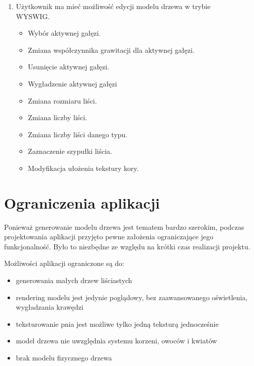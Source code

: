 \begin{enumerate}
\item Użytkownik ma mieć możliwość edycji modelu drzewa w trybie \\WYSWIG.
\begin{itemize}
\item Wybór aktywnej gałęzi.
\item Zmiana współczynnika grawitacji dla aktywnej gałęzi.
\item Usunięcie aktywnej gałęzi.
\item Wygładzenie aktywnej gałęzi
\item Zmiana rozmiaru liści.
\item Zmiana liczby liści.
\item Zmiana liczby liści danego typu.
\item Zaznaczenie szypułki liścia.
\item Modyfikacja ułożenia tekstury kory.
\end{itemize}
\end{enumerate}

\section{Ograniczenia aplikacji}
Ponieważ generowanie modelu drzewa jest tematem bardzo szerokim, podczas projektowania
aplikacji przyjęto pewne założenia ograniczające jego funkcjonalność. Było to niezbędne ze
względu na krótki czas realizacji projektu.

Możliwości aplikacji ograniczone są do:
\begin{itemize}
	\item {generowania małych drzew liściastych}
	\item {rendering modelu jest jedynie poglądowy, bez zaawansowanego oświetlenia, wygładzania krawędzi}
	\item {teksturowanie pnia jest możliwe tylko jedną teksturą jednocześnie}
	\item {model drzewa nie uwzględnia systemu korzeni, owoców i kwiatów}
	\item {brak modelu fizycznego drzewa}
\end{itemize}
